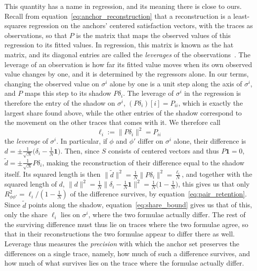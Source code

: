 \documentclass[titlepage,a4paper,11pt]{report}
\begin{document}
    This quantity has a name in regression, and its meaning there is close to ours. Recall from equation~\eqref{eq:anchor_reconstruction} that a reconstruction is a least-squares regression on the anchors' centered satisfaction vectors, with the traces as observations, so that $P$ is the matrix that maps the observed values of this regression to its fitted values. In regression, this matrix is known as the hat matrix, and its diagonal entries are called the \emph{leverages} of the observations~\citep{hoaglin_hat_1978}. The leverage of an observation is how far its fitted value moves when its own observed value changes by one, and it is determined by the regressors alone. In our terms, changing the observed value on $\sigma^i$ alone by one is a unit step along the axis of $\sigma^i$, and $P$ maps this step to its shadow $P\delta_i$. The leverage of $\sigma^i$ in the regression is therefore the entry of the shadow on $\sigma^i$, $(P\delta_i)[i]=P_{ii}$, which is exactly the largest share found above, while the other entries of the shadow correspond to the movement on the other traces that comes with it. We therefore call
    \begin{equation}\label{eq:leverage_def}
        \ell_i := \lVert P\delta_i\rVert^2 = P_{ii}
    \end{equation}
    the \emph{leverage} of $\sigma^i$. In particular, if $\phi$ and $\phi'$ differ on $\sigma^i$ alone, their difference is $d=\pm\frac{1}{\sqrt N}\bigl(\delta_i-\frac1N\mathbf 1\bigr)$. Then, since $S$ consists of centered vectors and thus $P\mathbf 1=0$, $\tilde d=\pm\frac{1}{\sqrt N}P\delta_i$, making the reconstruction of their difference equal to the shadow itself. Its squared length is then $\lVert\tilde d\rVert^2=\frac1N\lVert P\delta_i\rVert^2=\frac{\ell_i}{N}$, and together with the squared length of $d$, $\lVert d\rVert^2=\frac1N\bigl\lVert\delta_i-\frac1N\mathbf 1\bigr\rVert^2=\frac1N\bigl(1-\frac1N\bigr)$, this gives us that only $R^2_{\phi\phi'}=\ell_i/(1-\frac1N)$ of the difference survives, by equation~\eqref{eq:pair_retention}. Since $\tilde d$ points along the shadow, equation~\eqref{eq:share_bound} gives us that of this, only the share $\ell_i$ lies on $\sigma^i$, where the two formulae actually differ. The rest of the surviving difference must thus lie on traces where the two formulae agree, so that in their reconstructions the two formulae appear to differ there as well. Leverage thus measures the \emph{precision} with which the anchor set preserves the differences on a single trace, namely, how much of such a difference survives, and how much of what survives lies on the trace where the formulae actually differ.
    
\end{document}
